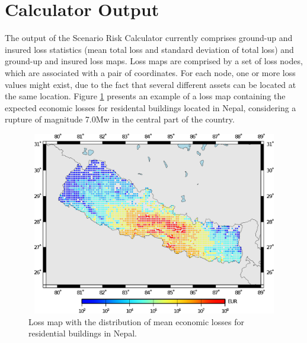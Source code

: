 \section{Calculator Output}
The output of the Scenario Risk Calculator currently comprises ground-up and insured loss statistics (mean total loss and standard deviation of total loss) and ground-up and insured loss  maps. Loss maps are comprised by a set of loss nodes, which are associated with a pair of coordinates. For each node, one or more loss values might exist, due to the fact that several different \glspl{asset} can be located at the same location.  Figure \ref{fig:detlosses} presents an example of a loss map containing the expected economic losses for residental buildings located in Nepal, considering a rupture of magnitude 7.0Mw in the central part of the country.

\begin{figure}[ht]
\centering
\includegraphics[width=12cm,height=8cm]{./figures/risk/LossmapDet.eps}
\caption{Loss map with the distribution of mean economic losses for residential buildings in Nepal.}
\label{fig:detlosses}
\end{figure} 